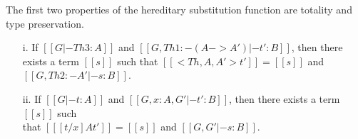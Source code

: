 The first two properties of the hereditary substitution function are
totality and type preservation.  
\begin{lemma}
  \label{lemma:totality_and_type_preservation}
  \begin{itemize}
  \item[i.] If $[[G |- Th 3 : A]]$ and $[[G, Th 1:{-(A->A')} |- t' : B]]$, then there
    exists a term $[[s]]$ such that $[[<Th,A,A'>t']] = [[s]]$ and $[[G, Th 2 :{-A'} |- s : B]]$.
  
  \item[ii.] If $[[G |- t : A]]$ and $[[G, x:A, G' |- t':B]]$, then there exists a term $[[s]]$ 
    such \\ that $[[ [t/x] A t']] = [[s]]$ and $[[G,G' |- s:B]]$.
  \end{itemize}
\end{lemma}
